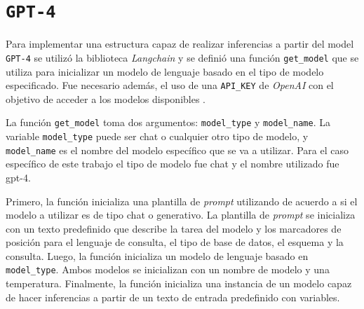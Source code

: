 \section{\texttt{GPT-4}}

Para implementar una estructura capaz de realizar inferencias a partir del model \texttt{GPT-4} se utilizó la biblioteca \textit{Langchain} y se definió una función \texttt{get\_model} que se utiliza para inicializar un modelo de lenguaje basado en el tipo de modelo especificado. Fue necesario además, el uso de una \texttt{API\_KEY} de \textit{OpenAI} con el objetivo de acceder a los modelos disponibles \cite{openaiapikey}.

La función \texttt{get\_model} toma dos argumentos: \texttt{model\_type} y \texttt{model\_name}. La variable \texttt{model\_type} puede ser chat o cualquier otro tipo de modelo, y \texttt{model\_name} es el nombre del modelo específico que se va a utilizar. Para el caso específico de este trabajo el tipo de modelo fue chat y el nombre utilizado fue gpt-4.

Primero, la función inicializa una plantilla de \textit{prompt} utilizando de acuerdo a si el modelo a utilizar es de tipo chat o generativo. La plantilla de \textit{prompt} se inicializa con un texto predefinido que describe la tarea del modelo y los marcadores de posición para el lenguaje de consulta, el tipo de base de datos, el esquema y la consulta. Luego, la función inicializa un modelo de lenguaje basado en \texttt{model\_type}. Ambos modelos se inicializan con un nombre de modelo y una temperatura. Finalmente, la función inicializa una instancia de un modelo capaz de hacer inferencias a partir de un texto de entrada predefinido con variables.

